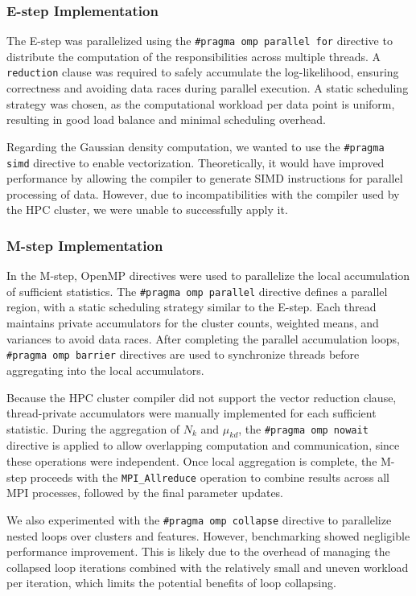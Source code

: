 \subsubsection*{E-step Implementation}
The E-step was parallelized using the \texttt{\#pragma omp parallel for} directive to distribute the computation of the responsibilities across multiple threads.
A \texttt{reduction} clause was required to safely accumulate the log-likelihood, ensuring correctness and avoiding data races during parallel execution.
A static scheduling strategy was chosen, as the computational workload per data point is uniform, resulting in good load balance and minimal scheduling overhead.

Regarding the Gaussian density computation, we wanted to use the \texttt{\#pragma simd} directive to enable vectorization.
Theoretically, it would have improved performance by allowing the compiler to generate SIMD instructions for parallel processing of data.
However, due to incompatibilities with the compiler used by the HPC cluster, we were unable to successfully apply it. 

\subsubsection*{M-step Implementation}
In the M-step, OpenMP directives were used to parallelize the local accumulation of sufficient statistics.  
The \texttt{\#pragma omp parallel} directive defines a parallel region, with a static scheduling strategy similar to the E-step.  
Each thread maintains private accumulators for the cluster counts, weighted means, and variances to avoid data races.  
After completing the parallel accumulation loops, \texttt{\#pragma omp barrier} directives are used to synchronize threads before aggregating into the local accumulators.  

Because the HPC cluster compiler did not support the vector reduction clause, thread-private accumulators were manually implemented for each sufficient statistic.  
During the aggregation of $N_k$ and $\mu_{kd}$, the \texttt{\#pragma omp nowait} directive is applied to allow overlapping computation and communication, since these operations were independent.  
Once local aggregation is complete, the M-step proceeds with the \texttt{MPI\_Allreduce} operation to combine results across all MPI processes, followed by the final parameter updates.

We also experimented with the \texttt{\#pragma omp collapse} directive to parallelize nested loops over clusters and features.  
However, benchmarking showed negligible performance improvement.  
This is likely due to the overhead of managing the collapsed loop iterations combined with the relatively small and uneven workload per iteration, which limits the potential benefits of loop collapsing.

